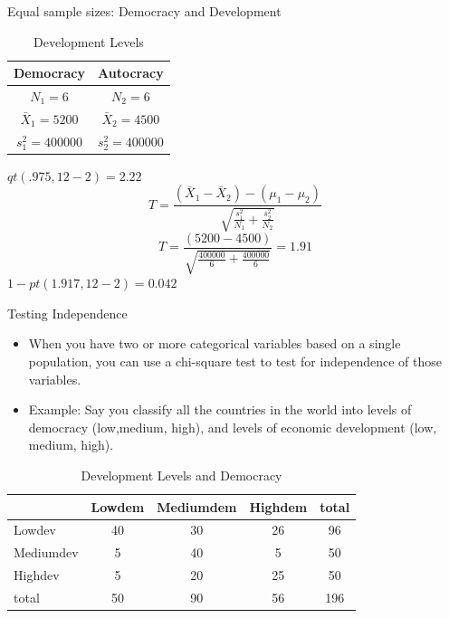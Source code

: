 \documentclass{beamer}
\numberwithin{equation}{section}
\begin{document}
\begin{frame}{Equal sample sizes: Democracy and Development}
\begin{table}[htdp]
\caption{Development Levels}
\begin{center}
\begin{tabular}{|c|c|}
\hline
Democracy& Autocracy\\
\hline
$N_1 = 6 $&$N_2 = 6$\\
$\bar{X}_1 = 5200$ &$\bar{X}_2 = 4500$\\
$s_1^2 = 400000$& $s_2^2 = 400000$\\
\hline
\end{tabular}
\end{center}
\label{default}
$qt(.975, 12-2)=2.22$\pause
$$T=\frac{(\bar{X}_1-\bar{X}_2)-(\mu_1-\mu_2)}{\sqrt{\frac{s_1^2}{N_1}+\frac{s_2^2}{N_2}}}$$\pause
$$T=\frac{(5200-4500)}{\sqrt{\frac{400000}{6}+\frac{400000}{6}}}=1.91$$\pause
$1-pt(1.917, 12-2)=0.042$
\end{table}
\end{frame}


\begin{frame}{Testing Independence}
\begin{itemize}
\item When you have two or more categorical variables based on a single population, you can use a chi-square test to test for independence of those variables.\pause

\item Example: Say you classify all the countries in the world into levels of democracy (low,medium, high), and levels of economic development (low, medium, high).\pause
\end{itemize}
\begin{table}[htdp]
\caption{Development Levels and Democracy}
\begin{center}
\begin{tabular}{l|ccc|c}
\hline
&Lowdem &Mediumdem &Highdem &total\\
\hline
Lowdev& 40 &30& 26 &96\\
Mediumdev& 5& 40& 5& 50\\
Highdev &5& 20& 25& 50\\
\hline 
total &50& 90& 56& 196
\end{tabular}
\end{center}
\end{table}
\end{frame}
\end{document}
